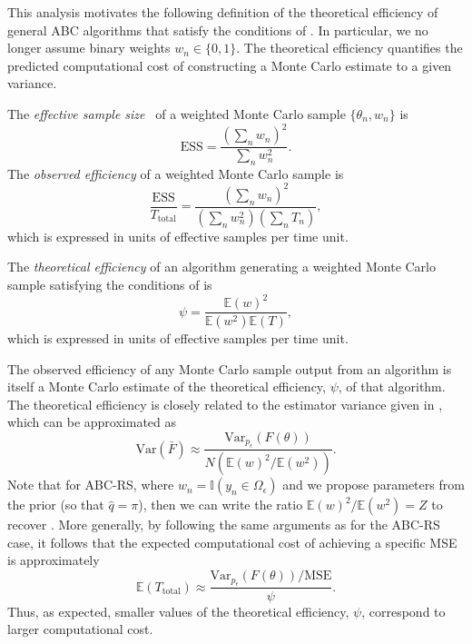 \documentclass[review,demo]{siamonline190516}
\begin{document}
This analysis motivates the following definition of the theoretical efficiency of general ABC algorithms that satisfy the conditions of .
In particular, we no longer assume binary weights $w_n \in \{ 0,1\}$.
The theoretical efficiency quantifies the predicted computational cost of constructing a Monte Carlo estimate to a given variance.

\begin{definition}
\label{def:efficiency:obs}
The \emph{effective sample size}~\cite{Elvira2018} of a weighted Monte Carlo sample $\{ \theta_n, w_n \}$ is 
\[
\mathrm{ESS} = \frac{\left(\sum_n w_n\right)^2}{\sum_n w_n^2}.
\]
The \emph{observed efficiency} of a weighted Monte Carlo sample is
\[
\frac{\mathrm{ESS}}{T_{\mathrm{total}}} = \frac{\left(\sum_n w_n\right)^2}{\left( \sum_n w_n^2 \right) \left( \sum_n T_n \right)},
\]
which is expressed in units of effective samples per time unit.
\end{definition}
\begin{definition}
\label{def:efficiency:th}
The \emph{theoretical efficiency} of an algorithm generating a weighted Monte Carlo sample satisfying the conditions of  is
\[
	\psi = \frac{\mathbb E(w)^2}{\mathbb E(w^2) \mathbb E(T)},
\]
which is expressed in units of effective samples per time unit.
\end{definition}

The observed efficiency of any Monte Carlo sample output from an algorithm is itself a Monte Carlo estimate of the theoretical efficiency, $\psi$, of that algorithm.
The theoretical efficiency is closely related to the estimator variance given in , which can be approximated as
\[
\mathrm{Var} \left( \bar F \right) 
\approx
\frac{\mathrm{Var}_{p_\epsilon}(F(\theta))}{N \left( \mathbb E(w)^2 / \mathbb E(w^2) \right) }.
\]
Note that for ABC-RS, where $w_n = \mathbb I(y_n \in \Omega_\epsilon)$ and we propose parameters from the prior (so that $\hat q = \pi$), then we can write the ratio $\mathbb E(w)^2/\mathbb E(w^2) = Z$ to recover .
More generally, by following the same arguments as for the ABC-RS case, it follows that the expected computational cost of achieving a specific MSE is approximately
\[
\mathbb E(T_{\mathrm{total}}) \approx \frac{\mathrm{Var}_{p_\epsilon}(F(\theta)) / \mathrm{MSE}}{\psi}.
\]
Thus, as expected, smaller values of the theoretical efficiency, $\psi$, correspond to larger computational cost.
\end{document}
